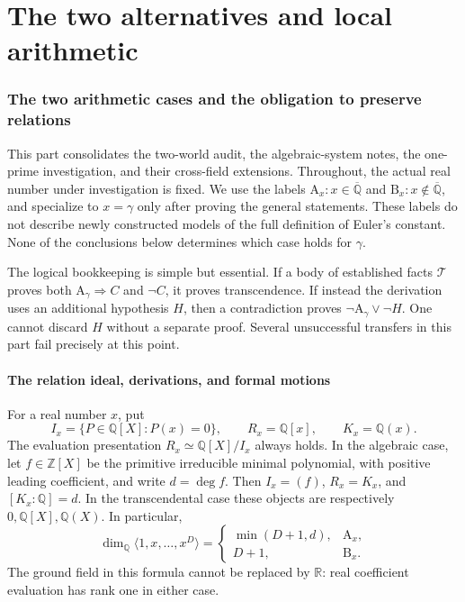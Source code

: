 \documentclass[11pt,a4paper]{article}
\newcommand{\Q}{\mathbb Q}
\newcommand{\R}{\mathbb R}
\newcommand{\Z}{\mathbb Z}
\newcommand{\Qbar}{\overline{\mathbb Q}}
\theoremstyle{definition}
\theoremstyle{remark}
\numberwithin{equation}{section}
\begin{document}
\clearpage
\part{The two alternatives and local arithmetic}\label{master:worlds}
\section{The two arithmetic cases and the obligation to preserve relations}
\label{wr:sec-worlds}

This part consolidates the two-world audit, the algebraic-system notes, the
one-prime investigation, and their cross-field extensions. Throughout, the
actual real number under investigation is fixed. We use the labels
\(\mathrm A_x:x\in\Qbar\) and \(\mathrm B_x:x\notin\Qbar\), and specialize
to \(x=\gamma\) only after proving the general statements. These labels do
not describe newly constructed models of the full definition of Euler's
constant. None of the conclusions below determines which case holds for
\(\gamma\).

The logical bookkeeping is simple but essential. If a body of established
facts \(\mathcal T\) proves both \(\mathrm A_\gamma\Rightarrow C\) and
\(\neg C\), it proves transcendence. If instead the derivation uses an
additional hypothesis \(H\), then a contradiction proves
\(\neg\mathrm A_\gamma\lor\neg H\). One cannot discard \(H\) without a
separate proof. Several unsuccessful transfers in this part fail precisely
at this point.

\subsection{The relation ideal, derivations, and formal motions}

For a real number \(x\), put
\[
 I_x=\{P\in\Q[X]:P(x)=0\},\qquad R_x=\Q[x],\qquad K_x=\Q(x).
\]
The evaluation presentation \(R_x\simeq\Q[X]/I_x\) always holds. In the
algebraic case, let \(f\in\Z[X]\) be the primitive irreducible minimal
polynomial, with positive leading coefficient, and write \(d=\deg f\).
Then \(I_x=(f)\), \(R_x=K_x\), and \([K_x:\Q]=d\). In the transcendental
case these objects are respectively \(0,\Q[X],\Q(X)\). In particular,
\begin{equation}\label{wr:eq-rank}
 \dim_\Q\langle1,x,\ldots,x^D\rangle
 =\begin{cases}\min(D+1,d),&\mathrm A_x,\\ D+1,&\mathrm B_x.\end{cases}
\end{equation}
The ground field in this formula cannot be replaced by \(\R\): real
coefficient evaluation has rank one in either case.
\end{document}
